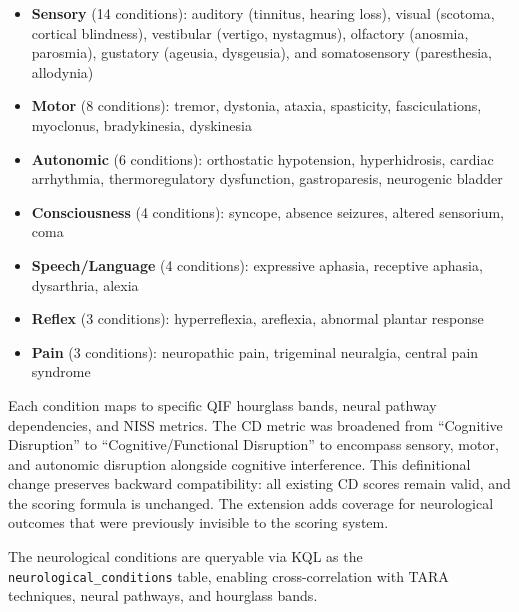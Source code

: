 \begin{itemize}
  \item \textbf{Sensory} (14 conditions): auditory (tinnitus, hearing loss),
    visual (scotoma, cortical blindness), vestibular (vertigo, nystagmus),
    olfactory (anosmia, parosmia), gustatory (ageusia, dysgeusia), and
    somatosensory (paresthesia, allodynia)
  \item \textbf{Motor} (8 conditions): tremor, dystonia, ataxia, spasticity,
    fasciculations, myoclonus, bradykinesia, dyskinesia
  \item \textbf{Autonomic} (6 conditions): orthostatic hypotension,
    hyperhidrosis, cardiac arrhythmia, thermoregulatory dysfunction,
    gastroparesis, neurogenic bladder
  \item \textbf{Consciousness} (4 conditions): syncope, absence seizures,
    altered sensorium, coma
  \item \textbf{Speech/Language} (4 conditions): expressive aphasia, receptive
    aphasia, dysarthria, alexia
  \item \textbf{Reflex} (3 conditions): hyperreflexia, areflexia, abnormal
    plantar response
  \item \textbf{Pain} (3 conditions): neuropathic pain, trigeminal neuralgia,
    central pain syndrome
\end{itemize}

Each condition maps to specific QIF hourglass bands, neural pathway
dependencies, and NISS metrics. The CD metric was broadened from ``Cognitive
Disruption'' to ``Cognitive/Functional Disruption'' to encompass sensory, motor,
and autonomic disruption alongside cognitive interference. This definitional
change preserves backward compatibility: all existing CD scores remain valid,
and the scoring formula is unchanged. The extension adds coverage for
neurological outcomes that were previously invisible to the scoring system.

The neurological conditions are queryable via KQL as the
\texttt{neurological\_conditions} table, enabling cross-correlation with TARA
techniques, neural pathways, and hourglass bands.
